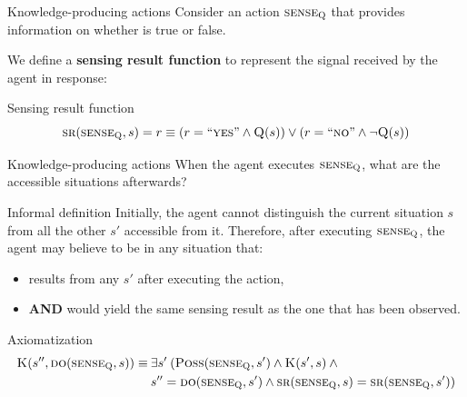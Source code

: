 \begin{frame}{Knowledge-producing actions}
    Consider an action \( \textsc{sense}_{\textsc{Q}} \) that provides information on whether \scq{} is true or false.

    We define a \textbf{sensing result function} to represent the signal received by the agent in response:

    \begin{block}{Sensing result function}
        \[ \textsc{sr}(\textsc{sense}_{\textsc{Q}}, s) = r \equiv (r = ``\textsc{yes}" \land \textsc{Q}(s)) \lor (r = ``\textsc{no}" \land \lnot \textsc{Q}(s)) \]
    \end{block}
\end{frame}

\begin{frame}{Knowledge-producing actions}
    \vspace{-0.2cm}
    When the agent executes \( \textsc{sense}_{\textsc{Q}} \), what are the accessible situations afterwards?

    \begin{block}{Informal definition}
        Initially, the agent cannot distinguish the current situation \(s\) from all the other
        \(s'\) accessible from it. Therefore, after executing \( \textsc{sense}_{\textsc{Q}} \),
        the agent may believe to be in any situation that:
        \begin{itemize}
            \item results from any \(s'\) after executing the action,
            \item \textbf{AND} would yield the same sensing result as the one that has been observed.
        \end{itemize}
    \end{block}

    \begin{block}{Axiomatization}
        \vspace{-0.5cm}
        \begin{align*}
            \textsc{K}(s'', \textsc{do}(\textsc{sense}_{\textsc{Q}}, s)) \equiv \: & \exists s' \: (\textsc{Poss}(\textsc{sense}_{\textsc{Q}}, s') \land \textsc{K}(s',s) \: \land \\
            & s'' = \textsc{do}(\textsc{sense}_{\textsc{Q}}, s') \land \textsc{sr}(\textsc{sense}_{\textsc{Q}}, s) = \textsc{sr}(\textsc{sense}_{\textsc{Q}}, s'))
        \end{align*}
    \end{block}
\end{frame}

